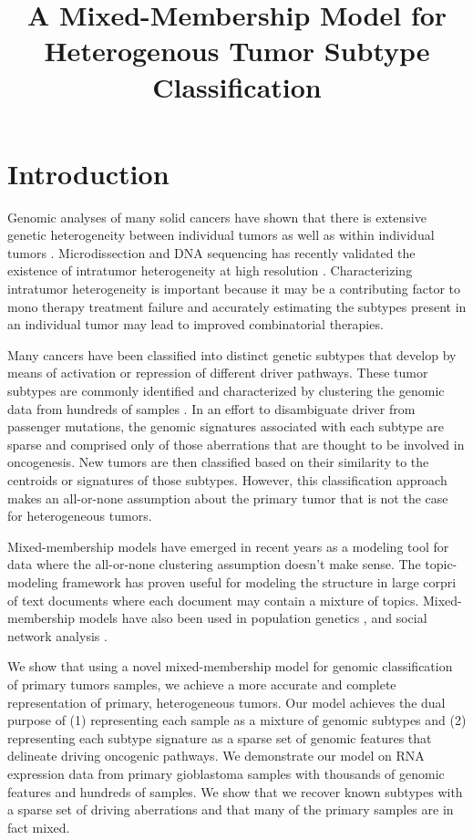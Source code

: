 \documentclass[11pt]{amsart}
\title{A Mixed-Membership Model for Heterogenous Tumor Subtype Classification}
\author{}
\begin{document}
\maketitle
\section{Introduction}

Genomic analyses of many solid cancers have shown that there is extensive genetic heterogeneity between individual tumors \cite{Parsons:2008fu, Bonavia:2011hf} as well as within individual tumors \cite{Heppner:1984ve, Dexter:1978ux}. Microdissection and DNA sequencing has recently validated the existence of intratumor heterogeneity at high resolution \cite{Gerlinger:2012fs}. Characterizing intratumor heterogeneity is important because it may be a contributing factor to mono therapy treatment failure \cite{} and accurately estimating the subtypes present in an individual tumor may lead to improved combinatorial therapies.

Many cancers have been classified into distinct genetic subtypes that develop by means of activation or repression of different driver pathways. These tumor subtypes are commonly identified and characterized by clustering the genomic data from hundreds of samples \cite{Eisen:1998ue}. In an effort to disambiguate driver from passenger mutations, the genomic signatures associated with each subtype are sparse and comprised only of those aberrations that are thought to be involved in oncogenesis. New tumors are then classified based on their similarity to the centroids or signatures of those subtypes. However, this classification approach makes an all-or-none assumption about the primary tumor that is not the case for heterogeneous tumors.

Mixed-membership models have emerged in recent years as a modeling tool for data where the all-or-none clustering assumption doesn't make sense. The topic-modeling framework \cite{Blei:2003tn} has proven useful for modeling the structure in large corpri of text documents where each document may contain a mixture of topics. Mixed-membership models have also been used in population genetics \cite{Pritchard:2000uv},  and social network analysis \cite{Airoldi:2008wi}.

We show that using a novel mixed-membership model for genomic classification of primary tumors samples, we achieve a more accurate and complete representation of primary, heterogeneous tumors. Our model achieves the dual purpose of (1) representing each sample as a mixture of genomic subtypes and (2) representing each subtype signature as a sparse set of genomic features that delineate driving oncogenic pathways. We demonstrate our model on RNA expression data from primary gioblastoma samples with thousands of genomic features and hundreds of samples. We show that we recover known subtypes with a sparse set of driving aberrations and that many of the primary samples are in fact mixed.
\end{document}
